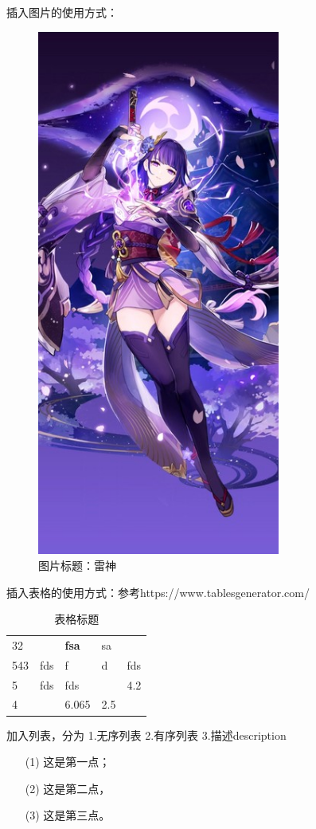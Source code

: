 \documentclass[12pt,a4paper,oneside]{ctexart}
\begin{document}
\newpage
插入图片的使用方式：
\begin{figure}[htbp] %
    \centering %
    \includegraphics[width=8cm]{pics/雷电将军.jpg} %
    \caption{图片标题：雷神}
\end{figure}

\newpage
插入表格的使用方式：参考https://www.tablesgenerator.com/
\begin{table}[htbp]
    \centering 
    \caption{表格标题}
    \begin{tabular}{lllll}
    32  &     & \textbf{fsa} & sa  &     \\
    543 & fds & f            & d   & fds \\
    5   & fds & fds          &     & 4.2 \\
    4   &     & 6.065        & 2.5 &    
    \end{tabular}
\end{table}

加入列表，分为
1.无序列表
2.有序列表
3.描述description
\begin{enumerate}
    \item[(1)] 这是第一点；
    \item[(2)] 这是第二点，
    \item[(3)] 这是第三点。
\end{enumerate}
\end{document}

